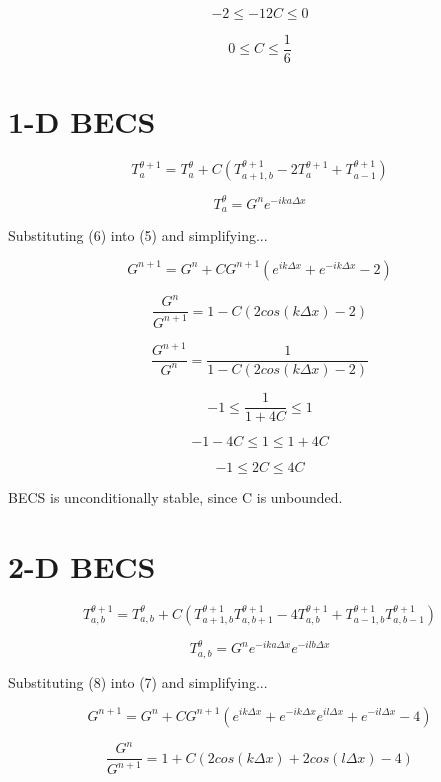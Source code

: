 \documentclass[a4paper,12pt]{article}
\begin{document}
\[
-2 \leq - 12C \leq 0
\]

\[
0 \leq C \leq \frac{1}{6}
\]

\pagebreak
\section{1-D BECS}

\begin{equation}
T_{a}^{\theta+1} = T_{a}^{\theta} + C \left(T_{a+1,b}^{\theta+1}
- 2T_{a}^{\theta+1}
+ T_{a-1}^{\theta+1}
\right)
\end{equation}

\begin{equation}
T_{a}^{\theta} = G^n e^{-ika\Delta x}
\end{equation}

Substituting (6) into (5) and simplifying...

\[
G^{n+1} = G^n + C G^{n+1}
\left(
e^{ik\Delta x} + e^{-ik\Delta x}
- 2
\right)
\]

\[
\frac{G^n}{G^{n+1}} = 1 - C
\left(
2cos(k \Delta x) -  2
\right)
\]

\[
\frac{G^{n+1}}{G^n} = \frac{1}{1 - C
\left(
2cos(k \Delta x) -  2
\right)}
\]

\[
-1 \leq \frac{1}{1 + 4C} \leq 1
\]

\[
-1-4C \leq 1 \leq 1+4C
\]

\[
-1 \leq 2C \leq 4C
\]

BECS is unconditionally stable, since C is unbounded.

\pagebreak
\section{2-D BECS}

\begin{equation}
T_{a,b}^{\theta+1} = T_{a,b}^{\theta} + C \left(
T_{a+1,b}^{\theta+1}
T_{a,b+1}^{\theta+1}
- 4T_{a,b}^{\theta+1}
+ T_{a-1,b}^{\theta+1}
T_{a,b-1}^{\theta+1}
\right)
\end{equation}

\begin{equation}
T_{a,b}^{\theta} = G^n e^{-ika\Delta x} e^{-ilb\Delta x}
\end{equation}

Substituting (8) into (7) and simplifying...

\[
G^{n+1} = G^n + C G^{n+1}
\left(
e^{ik\Delta x} + e^{-ik\Delta x}
e^{il\Delta x} + e^{-il\Delta x}
- 4
\right)
\]

\[
\frac{G^n}{G^{n+1}} = 1 + C
\left(
2cos(k \Delta x) + 2cos(l \Delta x) -  4
\right)
\]
\end{document}
